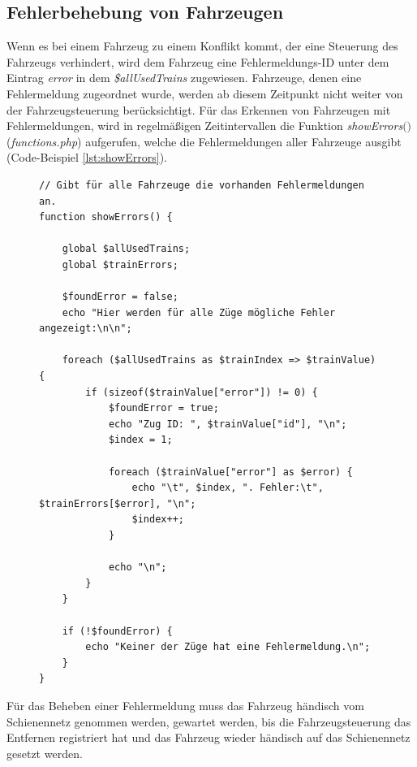 \subsection{Fehlerbehebung von Fahrzeugen} \label{main_7}
Wenn es bei einem Fahrzeug zu einem Konflikt kommt, der eine Steuerung des Fahrzeugs verhindert, wird dem Fahrzeug eine Fehlermeldungs-ID unter dem Eintrag \textit{error} in dem \textit{\$allUsedTrains} zugewiesen. Fahrzeuge, denen eine Fehlermeldung zugeordnet wurde, werden ab diesem Zeitpunkt nicht weiter von der Fahrzeugsteuerung berücksichtigt. Für das Erkennen von Fahrzeugen mit Fehlermeldungen, wird in regelmäßigen Zeitintervallen die Funktion \textit{showErrors$($$)$} (\textit{functions.php}) aufgerufen, welche die Fehlermeldungen aller Fahrzeuge ausgibt (Code-Beispiel \ref{lst:showErrors}).
\begin{figure}
\begin{lstlisting}[caption={\textit{showErrors$($$)$} (\textit{functions.php})},captionpos=b,label={lst:showErrors}]
// Gibt für alle Fahrzeuge die vorhanden Fehlermeldungen an.
function showErrors() {

	global $allUsedTrains;
	global $trainErrors;

	$foundError = false;
	echo "Hier werden für alle Züge mögliche Fehler angezeigt:\n\n";

	foreach ($allUsedTrains as $trainIndex => $trainValue) {
		if (sizeof($trainValue["error"]) != 0) {
			$foundError = true;
			echo "Zug ID: ", $trainValue["id"], "\n";
			$index = 1;

			foreach ($trainValue["error"] as $error) {
				echo "\t", $index, ". Fehler:\t", $trainErrors[$error], "\n";
				$index++;
			}

			echo "\n";
		}
	}

	if (!$foundError) {
		echo "Keiner der Züge hat eine Fehlermeldung.\n";
	}
}
\end{lstlisting}
\end{figure}
Für das Beheben einer Fehlermeldung muss das Fahrzeug händisch vom Schienennetz genommen werden, gewartet werden, bis die Fahrzeugsteuerung das Entfernen registriert hat und das Fahrzeug wieder händisch auf das Schienennetz gesetzt werden.

